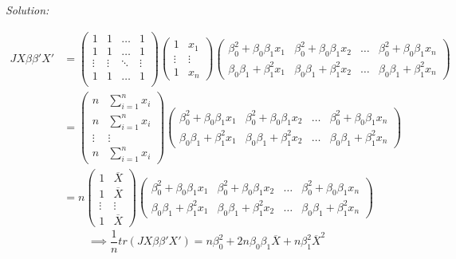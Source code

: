 \documentclass{article}
\newenvironment{solution}
    {\textit{Solution:}}
    {}
\begin{document}
\begin{solution}
\begin{itemize}
\begin{align*}
J X \beta \beta' X' &= \begin{pmatrix}
1 & 1 & \ldots & 1 \\
1 & 1 & \ldots & 1 \\
\vdots & \vdots & \ddots & \vdots \\
1 & 1 & \ldots & 1 \\
\end{pmatrix}
\begin{pmatrix}
1 & x_1 \\
\vdots & \vdots \\
1 & x_n
\end{pmatrix} \begin{pmatrix}
\beta_0^2 + \beta_0 \beta_1 x_1 & \beta_0^2 + \beta_0 \beta_1 x_2 & \ldots & \beta_0^2 + \beta_0 \beta_1 x_n \\
\beta_0 \beta_1 + \beta_1^2 x_1 & \beta_0 \beta_1 + \beta_1^2 x_2 & \ldots & \beta_0 \beta_1 + \beta_1^2 x_n 
\end{pmatrix} \\
&= \begin{pmatrix}
n & \sum_{i = 1}^n x_i \\
n &  \sum_{i = 1}^n x_i \\
\vdots & \vdots \\
n &  \sum_{i = 1}^n x_i
\end{pmatrix} \begin{pmatrix}
\beta_0^2 + \beta_0 \beta_1 x_1 & \beta_0^2 + \beta_0 \beta_1 x_2 & \ldots & \beta_0^2 + \beta_0 \beta_1 x_n \\
\beta_0 \beta_1 + \beta_1^2 x_1 & \beta_0 \beta_1 + \beta_1^2 x_2 & \ldots & \beta_0 \beta_1 + \beta_1^2 x_n 
\end{pmatrix} \\
&= n \begin{pmatrix}
1 &  \overline{X} \\
1 &  \overline{X} \\
\vdots & \vdots \\
1 &   \overline{X}
\end{pmatrix} \begin{pmatrix}
\beta_0^2 + \beta_0 \beta_1 x_1 & \beta_0^2 + \beta_0 \beta_1 x_2 & \ldots & \beta_0^2 + \beta_0 \beta_1 x_n \\
\beta_0 \beta_1 + \beta_1^2 x_1 & \beta_0 \beta_1 + \beta_1^2 x_2 & \ldots & \beta_0 \beta_1 + \beta_1^2 x_n 
\end{pmatrix} 
\end{align*} 
$$\implies \frac{1}{n}tr(J X \beta \beta' X') = n \beta_0^2 +  2 n \beta_0 \beta_1 \overline{X} + n \beta_1^2 \overline{X}^2$$

\end{itemize}
\end{solution}
\end{document}

